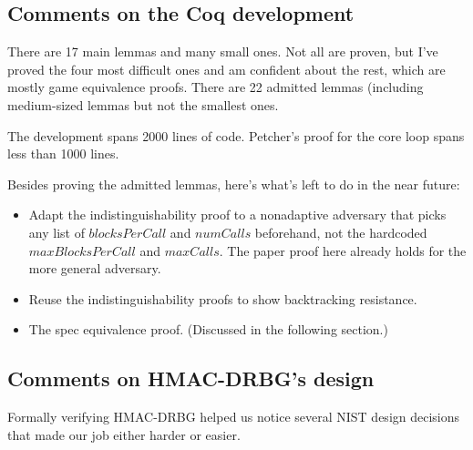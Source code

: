 \documentclass[12pt,lot, lof]{puthesis}
\begin{document}
{%



\subsection{Comments on the Coq development}

There are 17 main lemmas and many small ones. Not all are proven, but I've proved the four most difficult ones and am confident about the rest, which are mostly game equivalence proofs. There are 22 admitted lemmas (including medium-sized lemmas but not the smallest ones.

The development spans 2000 lines of code. Petcher's proof for the core loop spans less than 1000 lines.

Besides proving the admitted lemmas, here's what's left to do in the near future:

\begin{itemize}
\item Adapt the indistinguishability proof to a nonadaptive adversary that picks any list of $blocksPerCall$ and $numCalls$ beforehand, not the hardcoded $maxBlocksPerCall$ and $maxCalls$. The paper proof here already holds for the more general adversary.
\item Reuse the indistinguishability proofs to show backtracking resistance.
\item The spec equivalence proof. (Discussed in the following section.)
\end{itemize}

\subsection{Comments on HMAC-DRBG's design}

Formally verifying HMAC-DRBG helped us notice several NIST design decisions that made our job either harder or easier.

}
\end{document}
